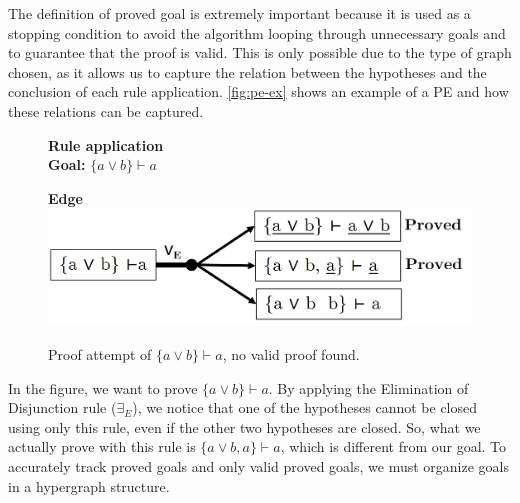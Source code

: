 The definition of proved goal is extremely important because it is used as a stopping condition to avoid the algorithm looping through unnecessary goals and to guarantee that the proof is valid. This is only possible due to the type of graph chosen, as it allows us to capture the relation between the hypotheses and the conclusion of each rule application. \autoref{fig:pe-ex} shows an example of a \gls{PE} and how these relations can be captured. 
\begin{figure}[h!]
\centering
\begin{minipage}{0.45\textwidth}
    \centering
    \textbf{Rule application}\\
    {\fontsize{10pt}{10pt}\selectfont \textbf{Goal:} \(\{a \vee b\} \vdash a\)}
    \begin{prooftree}
    \end{prooftree}
\end{minipage}
\hfill
\begin{minipage}{0.45\textwidth}
    \centering
    \textbf{Edge} \\[0.5em]
    \includegraphics[width=1\linewidth]{Chapters/Figures/pe-example.jpg}
\end{minipage}
        \caption{Proof attempt of $\{a \lor b\} \vdash a$, no valid proof found.}
\label{fig:pe-ex}
\end{figure}


In the figure, we want to prove \(\{a \vee b\} \vdash a\). By applying the Elimination of Disjunction rule (\(\exists_E\)), we notice that one of the hypotheses cannot be closed using only this rule, even if the other two hypotheses are closed. So, what we actually prove with this rule is \(\{a \vee b, a\} \vdash a\), which is different from our goal. To accurately track proved goals and only valid proved goals, we must organize goals in a hypergraph structure.

